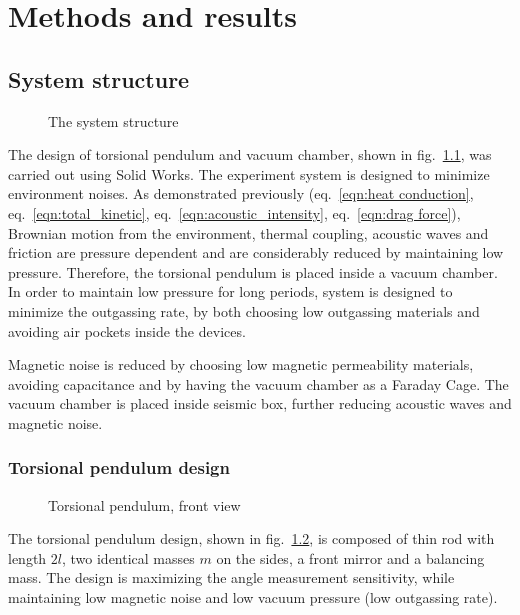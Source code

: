\documentclass[\main/master.tex]{subfiles}
\begin{document}
\chapter{Methods and results}\label{chapter:Methods and results}

\section{System structure}
\begin{figure}[htbp]
	\centering
	\caption[Total chamber]{The system structure}
	\label{fig:Total chamber}
\end{figure}
\FloatBarrier
\par\noindent
The design of torsional pendulum and vacuum chamber, shown in fig.~\ref{fig:Total chamber}, was carried out using Solid Works. The experiment system is designed to minimize environment noises. As demonstrated previously (eq.~\ref{eqn:heat conduction}, eq.~\ref{eqn:total_kinetic}, eq.~\ref{eqn:acoustic_intensity}, eq.~\ref{eqn:drag force}), Brownian motion from the environment, thermal coupling, acoustic waves and friction are pressure dependent and are considerably reduced by maintaining low pressure. Therefore, the torsional pendulum is placed inside a vacuum chamber. In order to maintain low pressure for long periods, system is designed to minimize the outgassing rate, by both choosing low outgassing materials and avoiding air pockets inside the devices. 
\par\noindent
Magnetic noise is reduced by choosing low magnetic permeability materials, avoiding capacitance and by having the vacuum chamber as a Faraday Cage. The vacuum chamber is placed inside seismic box, further reducing acoustic waves and magnetic noise. 
\subsection{Torsional pendulum design}
\begin{figure}[htbp]
	\centering
	\caption[Torsional pendulum, front view]{Torsional pendulum, front view}
	\label{fig:pendulum front}
\end{figure}
\FloatBarrier
\par\noindent
The torsional pendulum design, shown in fig.~\ref{fig:pendulum front}, is composed of thin rod with length $2l$, two identical masses $m$ on the sides, a front mirror and a balancing mass. The design is maximizing the angle measurement sensitivity, while maintaining low magnetic noise and low vacuum pressure (low outgassing rate). 
\end{document}
